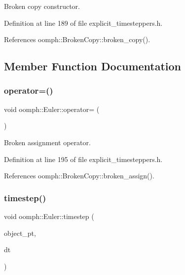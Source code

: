 Broken copy constructor. 



Definition at line 189 of file explicit\+\_\+timesteppers.\+h.



References oomph\+::\+Broken\+Copy\+::broken\+\_\+copy().



\subsection{Member Function Documentation}
\mbox{\label{classoomph_1_1Euler_a4065f553b267a18392b3d052f5779d31}} 
\subsubsection{\texorpdfstring{operator=()}{operator=()}}
{\footnotesize\ttfamily void oomph\+::\+Euler\+::operator= (\begin{DoxyParamCaption}\item[{const \hyperlink{classoomph_1_1Euler}{Euler} \&}]{ }\end{DoxyParamCaption})\hspace{0.3cm}{\ttfamily [inline]}}



Broken assignment operator. 



Definition at line 195 of file explicit\+\_\+timesteppers.\+h.



References oomph\+::\+Broken\+Copy\+::broken\+\_\+assign().

\mbox{\label{classoomph_1_1Euler_adeea8e3567a50fb3873fab05a7ca928a}} 
\subsubsection{\texorpdfstring{timestep()}{timestep()}}
{\footnotesize\ttfamily void oomph\+::\+Euler\+::timestep (\begin{DoxyParamCaption}\item[{\hyperlink{classoomph_1_1ExplicitTimeSteppableObject}{Explicit\+Time\+Steppable\+Object} $\ast$const \&}]{object\+\_\+pt,  }\item[{const double \&}]{dt }\end{DoxyParamCaption})\hspace{0.3cm}{\ttfamily [virtual]}}



